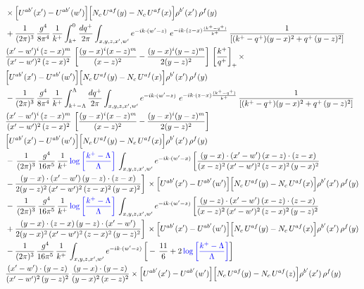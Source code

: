 \documentclass[9pt]{article}
\numberwithin{equation}{section}
\begin{document}
\begin{align}
&\times\Big[U^{ab'}(x')-U^{ab'}(w')\Big]\Big[N_{c}\,U^{af}(y)-N_{c}\,U^{af}(x)\Big]\rho^{b'}(x')\,\rho^{f}(y)\notag \\ & + \frac{1}{(2\pi)^{3}}\,\frac{g^{4}}{8\pi^{4}}\,\frac{1}{k^{+}}\int_{k^{+}}^{0}\frac{dq^{+}}{2\pi}\int_{x,y,z,x',w'}e^{-ik\cdot(w'-z)}\ e^{-ik\cdot(z-x)\frac{(k^{+}-q^{+})}{k^{+}}}\,\frac{1}{\left[(k^{+}-q^{+})(y-x)^{2}+q^{+}\,(y-z)^{2}\right]}\notag \\ & \frac{(x'-w')^{i}\,(z-x)^{m}}{(x'-w')^{2}\,(z-x)^{2}}\,\left[\frac{(y-x)^{i}(x-z)^{m}}{(x-z)^{2}}-\frac{(y-x)^{i}(y-z)^{m}}{2(y-z)^{2}}\right]\,\left[\frac{k^{+}}{q^{+}}\right]_{+}\times\notag \\ & \Big[U^{ab'}(x')-U^{ab'}(w')\Big]\Big[N_{c}\,U^{af}(y)-N_{c}\,U^{af}(x)\Big]\rho^{b'}(x')\,\rho^{f}(y)\notag \\ & - \frac{1}{(2\pi)^{3}}\,\frac{g^{4}}{8\pi^{4}}\,\frac{1}{k^{+}}\int_{k^{+}-\Lambda}^{\Lambda}\frac{dq^{+}}{2\pi}\int_{x,y,z,x',w'}e^{-ik\cdot(w'-z)}\ e^{-ik\cdot(z-x)\frac{(k^{+}-q^{+})}{k^{+}}}\,\frac{1}{\left[(k^{+}-q^{+})(y-x)^{2}+q^{+}\,(y-z)^{2}\right]}\notag \\ & \frac{(x'-w')^{i}\,(z-x)^{m}}{(x'-w')^{2}\,(z-x)^{2}}\,\left[\frac{(y-x)^{i}(x-z)^{m}}{(x-z)^{2}}-\frac{(y-x)^{i}(y-z)^{m}}{2(y-z)^{2}}\right]\notag \\ & \Big[U^{ab'}(x')-U^{ab'}(w')\Big]\Big[N_{c}\,U^{af}(y)-N_{c}\,U^{af}(x)\Big]\rho^{b'}(x')\,\rho^{f}(y)\notag \\ & -\, \frac{1}{(2\pi)^{3}}\,\frac{g^{4}}{16\pi^{5}}\,\frac{1}{k^{+}}\,{\color{blue}\log{\left[\frac{k^{+}-\Lambda}{\Lambda}\right]}}\,\int_{x,y,z,x',w'}e^{-ik\cdot(w'-x)}\, \bigg[\frac{(y-x)\cdot (x'-w')\,(x-z)\cdot (z-x)}{(x-z)^{2}\,(x'-w')^{2}\,(z-x)^{2}\,(y-x)^{2}}\notag \\ & -\frac{(y-x)\cdot (x'-w')\,(y-z)\cdot (z-x)}{2(y-z)^{2}\,(x'-w')^{2}\,(z-x)^{2}\,(y-x)^{2}}\bigg]\,\times \Big[U^{ab'}(x')-U^{ab'}(w')\Big]\Big[N_{c}\,U^{af}(y)-N_{c}\,U^{af}(x)\Big]\rho^{b'}(x')\,\rho^{f}(y)\notag \\ & -\, \frac{1}{(2\pi)^{3}}\,\frac{g^{4}}{16\pi^{5}}\,\frac{1}{k^{+}}\,{\color{blue}\log{\left[\frac{k^{+}-\Lambda}{\Lambda}\right]}}\,\int_{x,y,z,x',w'}e^{-ik\cdot(w'-z)}\,\bigg[\frac{(y-z)\cdot (x'-w')\,(x-z)\cdot (z-x)}{(x-z)^{2}\,(x'-w')^{2}\,(z-x)^{2}\,(y-z)^{2}}\notag \\ & +\frac{(y-x)\cdot (z-x)\,(y-z)\cdot (x'-w')}{2(y-x)^{2}\,(x'-w')^{2}\,(z-x)^{2}\,(y-z)^{2}}\bigg]\,\times \Big[U^{ab'}(x')-U^{ab'}(w')\Big]\Big[N_{c}\,U^{af}(y)-N_{c}\,U^{af}(x)\Big]\rho^{b'}(x')\,\rho^{f}(y)\notag \\ & - \frac{1}{(2\pi)^{3}}\,\frac{g^{4}}{16\pi^{5}}\,\frac{1}{k^{+}}\,\int_{x,y,z,x',w'}e^{-ik\cdot(w'-z)}\,\bigg[-\,\frac{11}{6}+2\,{\color{blue}\log{\left[\frac{k^{+}-\Lambda}{\Lambda}\right]}}\bigg]\notag \\ & \frac{(x'-w')\cdot(y-z)}{(x'-w')^{2}\,(y-z)^{2}}\,\frac{(y-x)\cdot(y-z)}{(y-x)^{2}\,(x-z)^{2}}\times\Big[U^{ab'}(x')-U^{ab'}(w')\Big]\Big[N_{c}\,U^{af}(y)-N_{c}\,U^{af}(z)\Big]\rho^{b'}(x')\,\rho^{f}(y)
\end{align}
\end{document}
